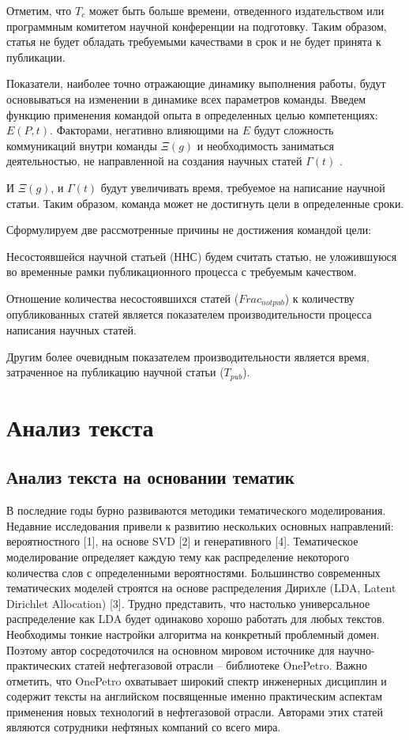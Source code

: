 Отметим, что $T_c$ может быть больше времени, отведенного издательством или программным комитетом научной конференции на подготовку. 
Таким образом, статья не будет обладать требуемыми качествами в срок и не будет принята к публикации.

Показатели, наиболее точно отражающие динамику выполнения работы, будут основываться на изменении в динамике всех параметров команды. 
Введем функцию применения командой опыта в определенных целью компетенциях: $E(P,t)$.
Факторами, негативно влияющими на $E$ будут сложность коммуникаций внутри команды $\Xi(g)$ и необходимость заниматься деятельностью, не направленной на создания научных статей $\Gamma(t)$ .

И $\Xi(g)$, и $\Gamma(t)$ будут увеличивать время, требуемое на написание научной статьи.
Таким образом, команда может не достигнуть цели в определенные сроки.

Сформулируем две рассмотренные причины не достижения командой цели:

\begin{defi} \label{defi:ex2}
Несостоявшейся научной статьей (ННС) будем считать статью, не уложившуюся во временные рамки публикационного процесса с требуемым качеством. 
\end{defi}

Отношение количества несостоявшихся статей ($Frac_{notpub}$) к количеству опубликованных статей является показателем производительности процесса написания научных статей.

Другим более очевидным показателем производительности является время, затраченное на публикацию научной статьи ($T_{pub}$).

\section{Анализ текста}
\label{sec:topicmodel}
\subsection{Анализ текста на основании тематик}
В последние годы бурно развиваются методики тематического моделирования. Недавние исследования привели к развитию нескольких основных направлений: вероятностного [1], на основе SVD [2] и генеративного [4].
Тематическое моделирование определяет каждую тему как распределение некоторого количества слов с определенными вероятностями. Большинство современных тематических моделей строятся на основе распределения Дирихле (LDA, Latent Dirichlet Allocation) [3].
Трудно представить, что настолько универсальное распределение как LDA будет одинаково хорошо работать для любых текстов. 
Необходимы тонкие настройки алгоритма на конкретный проблемный домен. 
Поэтому автор сосредоточился на основном мировом источнике для научно-практических статей нефтегазовой отрасли – библиотеке OnePetro. 
Важно отметить, что OnePetro охватывает широкий спектр инженерных дисциплин и содержит тексты на английском посвященные именно практическим аспектам применения новых технологий в нефтегазовой отрасли. 
Авторами этих статей являются сотрудники нефтяных компаний со всего мира.

